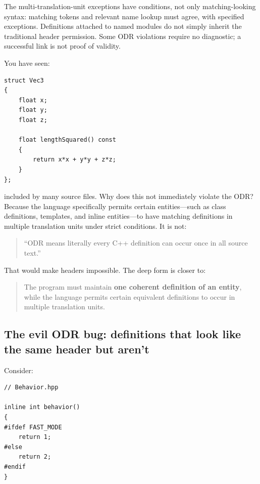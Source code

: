 \hypertarget{05-engine-i-ch002-why-class-definitions-may-live-in-headers}{}

The multi-translation-unit exceptions have conditions, not only matching-looking syntax: matching tokens and relevant name lookup must agree, with specified exceptions. Definitions attached to named modules do not simply inherit the traditional header permission. Some ODR violations require no diagnostic; a successful link is not proof of validity.

You have seen:

\begin{verbatim}
struct Vec3
{
    float x;
    float y;
    float z;

    float lengthSquared() const
    {
        return x*x + y*y + z*z;
    }
};
\end{verbatim}

included by many source files. Why does this not immediately violate the ODR? Because the language specifically permits certain entities---such as class definitions, templates, and inline entities---to have matching definitions in multiple translation units under strict conditions. It is not:

\begin{quote}
``ODR means literally every C++ definition can occur once in all source text.''
\end{quote}

That would make headers impossible. The deep form is closer to:

\begin{quote}
The program must maintain \textbf{one coherent definition of an entity}, while the language permits certain equivalent definitions to occur in multiple translation units.
\end{quote}

\subsection{The evil ODR bug: definitions that look like the same header but aren't}\label{05-engine-i-ch002-the-evil-odr-bug-definitions-that-look-like-the-same-header-but-arent}

\hypertarget{05-engine-i-ch002-the-evil-odr-bug-definitions-that-look-like-the-same-header-but-arent}{}

Consider:

\begin{verbatim}
// Behavior.hpp

inline int behavior()
{
#ifdef FAST_MODE
    return 1;
#else
    return 2;
#endif
}
\end{verbatim}

